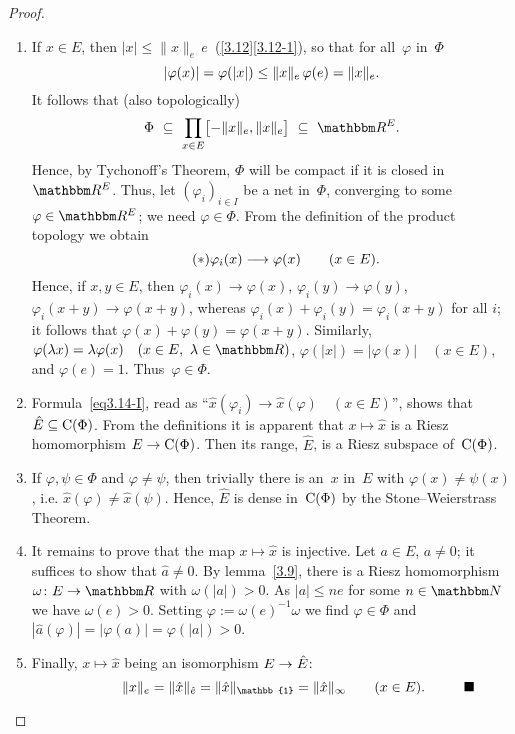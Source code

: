 \documentclass[main.tex]{subfiles}
\begin{document}
\begin{proof}
\begin{enumerate}[label=(\Roman*)]
\item \label{3.14-I}
If $x\in E$, then $|x|\leq \| x\|_e\, e$\ 
 (\ref{3.12}\ref{3.12-1}),
so that for all~$\varphi$ in~$\Phi$
\begin{equation*}
|\varphi(x)|=\varphi(|x|)\leq \|x\|_e\, \varphi(e)=\|x\|_e\text{.}
\end{equation*}
It follows that (also topologically)
\begin{equation*}
\Phi 
\ \subseteq  \ 
\prod_{x\in E} \bigl[-\| x \|_e , \|x \|_e \bigr] 
\ \subseteq \ \R^E\htam{.}
\end{equation*}
Hence,
by Tychonoff's Theorem,
$\Phi$ will be compact if it is closed in~$\R^E$.
Thus, let $(\varphi_i)_{i\in I}$
be a net in~$\Phi$,
converging to some $\varphi\in\R^E$;
we need $\varphi\in\Phi$.
From the definition of the product topology we obtain
\begin{equation}
\label{eq3.14-I} \tag{$*$}
\varphi_i(x) \longrightarrow \varphi(x) \qquad (x\in E)\text{.}
\end{equation}
Hence, 
if $x,y\in E$,
then $\varphi_i(x)\rightarrow \varphi(x)$,
$\varphi_i(y)\rightarrow \varphi(y)$,
$\varphi_i(x+y)\rightarrow \varphi(x+y)$,
whereas $\varphi_i(x)+\varphi_i(y)=\varphi_i(x+y)$ for all $i$;
it follows that $\varphi(x)+\varphi(y) = \varphi(x+y)$.
Similarly, $\varphi(\lambda x)=\lambda \varphi(x)
\quad (x\in E,\ \lambda\in \R)$,
$\varphi(|x|)=|\varphi(x)|\quad(x\in E)$,
and $\varphi(e)=1$.
Thus~$\varphi\in\Phi$.
%
\item \label{3.14-II}
Formula~\eqref{eq3.14-I},
read as ``$\hat{x}(\varphi_i)\rightarrow\hat{x}(\varphi)\quad (x\in E)$'',
shows that $\hat{E}\subseteq\mathrm{C}(\Phi)$.
From the definitions it is apparent that $x\mapsto\hat{x}$
is a Riesz homomorphism $E\rightarrow\mathrm{C}(\Phi)$.
Then its range, $\hat{E}$, 
is a Riesz subspace of~$\mathrm{C}(\Phi)$.
%
\item \label{3.14-III}
If $\varphi,\psi\in\Phi$ and $\varphi\neq\psi$,
then trivially there is an~$x$ in~$E$ with $\varphi(x)\neq\psi(x)$,
i.e. $\hat{x}(\varphi) \neq\hat{x}(\psi)$.
Hence, $\hat{E}$ is dense in~$\mathrm{C}(\Phi)$ by the 
Stone--Weierstrass Theorem.
%
\item \label{3.14-IV}
It remains to prove that the map $x\mapsto \hat{x}$
is injective.
Let $a\in E$, $a\neq 0$;
it suffices to show that $\hat{a}\neq 0$.
By lemma~\ref{3.9},
there is a Riesz homomorphism $\omega\colon E\ra \R$
with $\omega(|a|)>0$.
As $|a|\leq ne$ for some $n\in \N$
we have $\omega(e)>0$.
Setting $\varphi:=\omega(e)^{-1} \omega$
we find $\varphi\in \Phi$ 
and $|\hat{a}(\varphi)| = |\varphi(a)| = \varphi(|a|)>0$.
%
\item \label{3.14-V}
Finally,
$x\mapsto \hat{x}$
being an isomorphism $E\rightarrow \hat{E}$:
\begin{equation*}
\|x\|_e = \|\hat{x}\|_{\hat{e}} = \|\hat{x}\|_\mathbb{1} 
= \|\hat{x}\|_\infty\qquad (x\in E)\mathrlap{\htam{. \qquad \xqed}}
\end{equation*}
\end{enumerate}
\end{proof}
\end{document}
